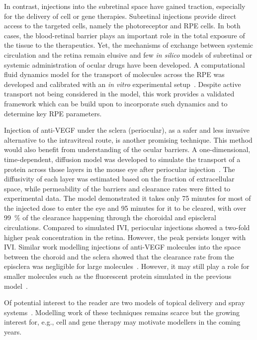 \documentclass{article}
\begin{document}
In contrast, injections into the subretinal space have gained traction, especially for the delivery of cell or gene therapies.
Subretinal injections provide direct access to the targeted cells, namely the photoreceptor and RPE cells.
In both cases, the blood-retinal barrier plays an important role in the total exposure of the tissue to the therapeutics.
Yet, the mechanisms of exchange between systemic circulation and the retina remain elusive and few \textit{in silico} models of subretinal or systemic administration of ocular drugs have been developed.
A computational fluid dynamics model for the transport of molecules across the RPE was developed and calibrated with an \textit{in vitro} experimental setup~\cite{Davies_2020}.
Despite active transport not being considered in the model, this work provides a validated framework which can be build upon to incorporate such dynamics and to determine key RPE parameters.

Injection of anti-VEGF under the sclera (periocular), as a safer and less invasive alternative to the intravitreal route, is another promising technique.
This method would also benefit from understanding of the ocular barriers.
A one-dimensional, time-dependent, diffusion model was developed to simulate the transport of a protein across those layers in the mouse eye after periocular injection~\cite{Gabhann_2007}.
The diffusivity of each layer was estimated based on the fraction of extracellular space, while permeability of the barriers and clearance rates were fitted to experimental data.
The model demonstrated it takes only 75 minutes for most of the injected dose to enter the eye and 95 minutes for it to be cleared, with over \SI{99}{\percent} of the clearance happening through the choroidal and episcleral circulations.
Compared to simulated IVI, periocular injections showed a two-fold higher peak concentration in the retina.
However, the peak persists longer with IVI.
Similar work modelling injections of anti-VEGF molecules into the space between the choroid and the sclera showed that the clearance rate from the episclera was negligible for large molecules~\cite{Zhang_2018}.
However, it may still play a role for smaller molecules such as the fluorescent protein simulated in the previous model~\cite{Gabhann_2007}.

Of potential interest to the reader are two models of topical delivery and spray systems~\cite{Mori_2017,Nweze_2020}.
Modelling work of these techniques remains scarce but the growing interest for, e.g., cell and gene therapy may motivate modellers in the coming years.
\end{document}
